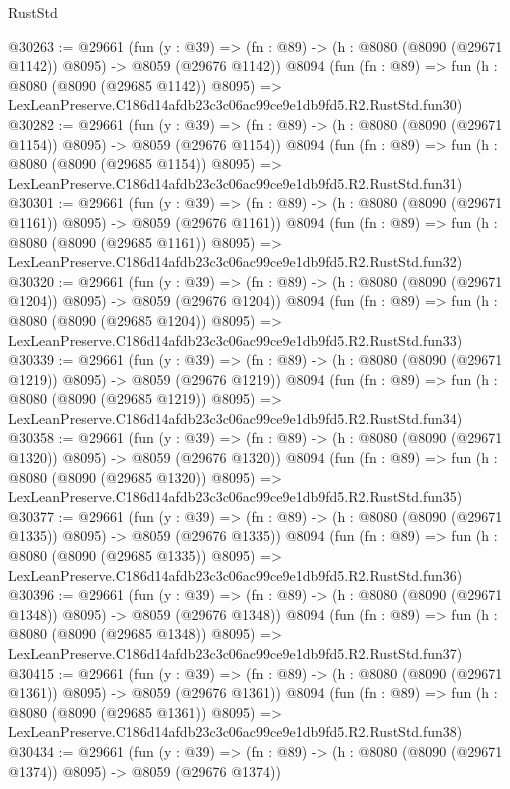 \begin{lexlean}{RustStd}
\begin{coremodule}
@30263 := @29661
    (fun (y : @39) =>
    (fn : @89) -> (h : @8080 (@8090 (@29671 @1142)) @8095) -> @8059 (@29676 @1142))
    @8094
    (fun (fn : @89) =>
    fun (h : @8080 (@8090 (@29685 @1142)) @8095) =>
    LexLeanPreserve.C186d14afdb23c3c06ac99ce9e1db9fd5.R2.RustStd.fun30)
@30282 := @29661
    (fun (y : @39) =>
    (fn : @89) -> (h : @8080 (@8090 (@29671 @1154)) @8095) -> @8059 (@29676 @1154))
    @8094
    (fun (fn : @89) =>
    fun (h : @8080 (@8090 (@29685 @1154)) @8095) =>
    LexLeanPreserve.C186d14afdb23c3c06ac99ce9e1db9fd5.R2.RustStd.fun31)
@30301 := @29661
    (fun (y : @39) =>
    (fn : @89) -> (h : @8080 (@8090 (@29671 @1161)) @8095) -> @8059 (@29676 @1161))
    @8094
    (fun (fn : @89) =>
    fun (h : @8080 (@8090 (@29685 @1161)) @8095) =>
    LexLeanPreserve.C186d14afdb23c3c06ac99ce9e1db9fd5.R2.RustStd.fun32)
@30320 := @29661
    (fun (y : @39) =>
    (fn : @89) -> (h : @8080 (@8090 (@29671 @1204)) @8095) -> @8059 (@29676 @1204))
    @8094
    (fun (fn : @89) =>
    fun (h : @8080 (@8090 (@29685 @1204)) @8095) =>
    LexLeanPreserve.C186d14afdb23c3c06ac99ce9e1db9fd5.R2.RustStd.fun33)
@30339 := @29661
    (fun (y : @39) =>
    (fn : @89) -> (h : @8080 (@8090 (@29671 @1219)) @8095) -> @8059 (@29676 @1219))
    @8094
    (fun (fn : @89) =>
    fun (h : @8080 (@8090 (@29685 @1219)) @8095) =>
    LexLeanPreserve.C186d14afdb23c3c06ac99ce9e1db9fd5.R2.RustStd.fun34)
@30358 := @29661
    (fun (y : @39) =>
    (fn : @89) -> (h : @8080 (@8090 (@29671 @1320)) @8095) -> @8059 (@29676 @1320))
    @8094
    (fun (fn : @89) =>
    fun (h : @8080 (@8090 (@29685 @1320)) @8095) =>
    LexLeanPreserve.C186d14afdb23c3c06ac99ce9e1db9fd5.R2.RustStd.fun35)
@30377 := @29661
    (fun (y : @39) =>
    (fn : @89) -> (h : @8080 (@8090 (@29671 @1335)) @8095) -> @8059 (@29676 @1335))
    @8094
    (fun (fn : @89) =>
    fun (h : @8080 (@8090 (@29685 @1335)) @8095) =>
    LexLeanPreserve.C186d14afdb23c3c06ac99ce9e1db9fd5.R2.RustStd.fun36)
@30396 := @29661
    (fun (y : @39) =>
    (fn : @89) -> (h : @8080 (@8090 (@29671 @1348)) @8095) -> @8059 (@29676 @1348))
    @8094
    (fun (fn : @89) =>
    fun (h : @8080 (@8090 (@29685 @1348)) @8095) =>
    LexLeanPreserve.C186d14afdb23c3c06ac99ce9e1db9fd5.R2.RustStd.fun37)
@30415 := @29661
    (fun (y : @39) =>
    (fn : @89) -> (h : @8080 (@8090 (@29671 @1361)) @8095) -> @8059 (@29676 @1361))
    @8094
    (fun (fn : @89) =>
    fun (h : @8080 (@8090 (@29685 @1361)) @8095) =>
    LexLeanPreserve.C186d14afdb23c3c06ac99ce9e1db9fd5.R2.RustStd.fun38)
@30434 := @29661
    (fun (y : @39) =>
    (fn : @89) -> (h : @8080 (@8090 (@29671 @1374)) @8095) -> @8059 (@29676 @1374))

\end{coremodule}
\end{lexlean}
